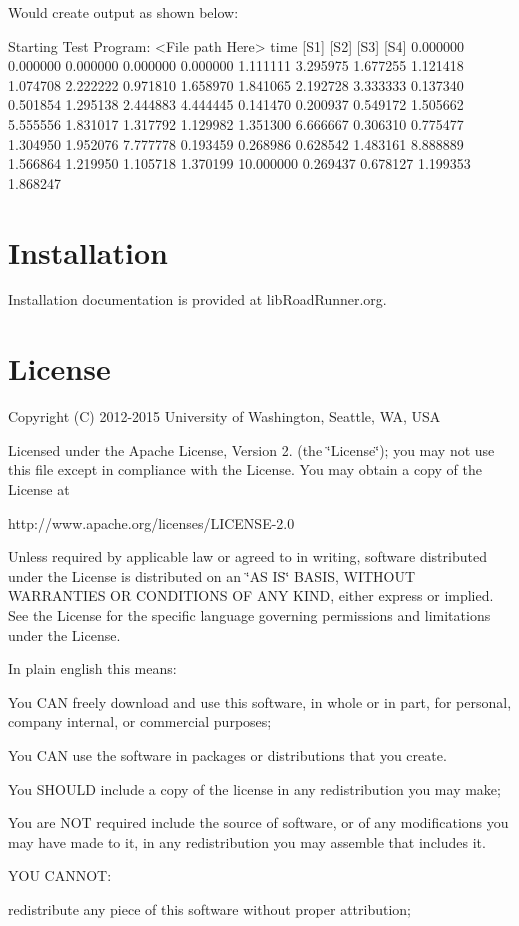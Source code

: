 Would create output as shown below\+:


\begin{DoxyCode}
Starting Test Program: <File path Here>
     time            [S1]            [S2]            [S3]            [S4]
 0.000000        0.000000        0.000000        0.000000        0.000000
 1.111111        3.295975        1.677255        1.121418        1.074708
 2.222222        0.971810        1.658970        1.841065        2.192728
 3.333333        0.137340        0.501854        1.295138        2.444883
 4.444445        0.141470        0.200937        0.549172        1.505662
 5.555556        1.831017        1.317792        1.129982        1.351300
 6.666667        0.306310        0.775477        1.304950        1.952076
 7.777778        0.193459        0.268986        0.628542        1.483161
 8.888889        1.566864        1.219950        1.105718        1.370199
10.000000        0.269437        0.678127        1.199353        1.868247
\end{DoxyCode}
 \hypertarget{index_install_sec}{}\section{Installation}\label{index_install_sec}
Installation documentation is provided at lib\+Road\+Runner.\+org.\hypertarget{index_license_sec}{}\section{License}\label{index_license_sec}
Copyright (C) 2012-\/2015 University of Washington, Seattle, W\+A, U\+S\+A

Licensed under the Apache License, Version 2. (the \char`\"{}\+License\char`\"{}); you may not use this file except in compliance with the License. You may obtain a copy of the License at \begin{DoxyVerb}http://www.apache.org/licenses/LICENSE-2.0
\end{DoxyVerb}


Unless required by applicable law or agreed to in writing, software distributed under the License is distributed on an \char`\"{}\+A\+S I\+S\char`\"{} B\+A\+S\+I\+S, W\+I\+T\+H\+O\+U\+T W\+A\+R\+R\+A\+N\+T\+I\+E\+S O\+R C\+O\+N\+D\+I\+T\+I\+O\+N\+S O\+F A\+N\+Y K\+I\+N\+D, either express or implied. See the License for the specific language governing permissions and limitations under the License.

In plain english this means\+:

You C\+A\+N freely download and use this software, in whole or in part, for personal, company internal, or commercial purposes;

You C\+A\+N use the software in packages or distributions that you create.

You S\+H\+O\+U\+L\+D include a copy of the license in any redistribution you may make;

You are N\+O\+T required include the source of software, or of any modifications you may have made to it, in any redistribution you may assemble that includes it.

Y\+O\+U C\+A\+N\+N\+O\+T\+:

redistribute any piece of this software without proper attribution; 